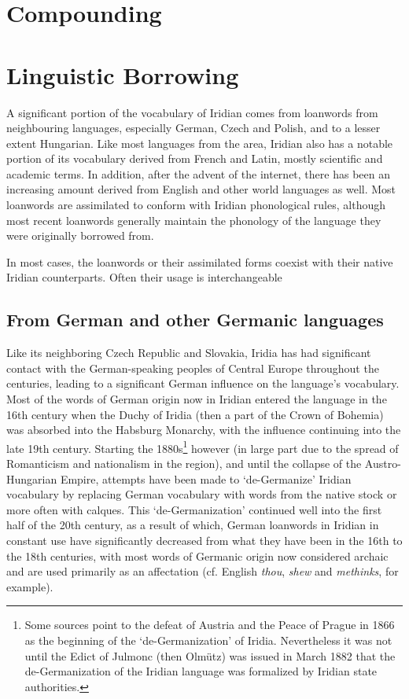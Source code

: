 \section{Compounding}\label{sec:compounding}

\section{Linguistic Borrowing}
A significant portion of the vocabulary of Iridian comes from loanwords from neighbouring languages, especially German, Czech and Polish, and to a lesser extent Hungarian. Like most languages from the area, Iridian also has a notable portion of its vocabulary derived from French and Latin, mostly scientific and academic terms. In addition, after the advent of the internet, there has been an increasing amount derived from English and other world languages as well. Most loanwords are assimilated to conform with Iridian phonological rules, although most recent loanwords generally maintain the phonology of the language they were originally borrowed from.

In most cases, the loanwords or their assimilated forms coexist with their native Iridian counterparts. Often their usage is interchangeable

\subsection{From German and other Germanic languages}

Like its neighboring Czech Republic and Slovakia, Iridia has had significant contact with the German-speaking peoples of Central Europe throughout the centuries, leading to a significant German influence on the language's vocabulary. Most of the words of German origin now in Iridian entered the language in the 16th century when the Duchy of Iridia (then a part of the Crown of Bohemia) was absorbed into the Habsburg Monarchy, with the influence continuing into the late 19th century. Starting the 1880s\footnote{Some sources point to the defeat of Austria and the Peace of Prague in 1866 as the beginning of the `de-Germanization' of Iridia. Nevertheless it was not until the Edict of Julmonc (then Olmütz) was issued in March 1882 that the de-Germanization of the Iridian language was formalized by Iridian state authorities.} however (in large part due to the spread of Romanticism and nationalism in the region), and until the collapse of the Austro-Hungarian Empire, attempts have been made to `de-Germanize' Iridian vocabulary by replacing German vocabulary with words from the native stock or more often with calques. This `de-Germanization' continued well into the first half of the 20th century, as a result of which, German loanwords in Iridian in constant use have significantly decreased from what they have been in the 16th to the 18th centuries, with most words of Germanic origin now considered archaic and are used primarily as an affectation (cf. English \emph{thou}, \emph{shew} and \emph{methinks}, for example).

